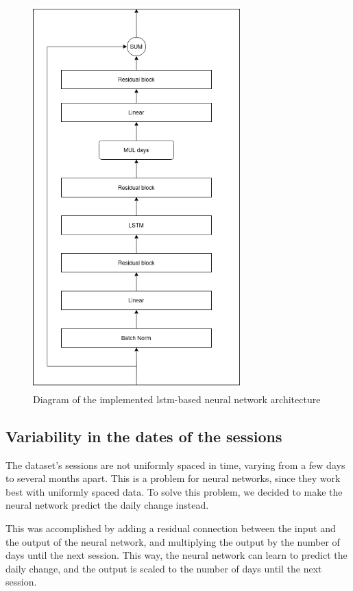 
\begin{figure}
    \centering
    \includegraphics[width=8cm]{files/nn_diagram}
    \caption{Diagram of the implemented \gls{lstm}-based neural network architecture}
\end{figure}

\subsection{Variability in the dates of the sessions}

The dataset's sessions are not uniformly spaced in time, varying from a few
days to several months apart. This is a problem for neural networks, since they
work best with uniformly spaced data. To solve this problem, we decided to make
the neural network predict the daily change instead.

This was accomplished by adding a residual connection between the input and the
output of the neural network, and multiplying the output by the number of days
until the next session. This way, the neural network can learn to predict the
daily change, and the output is scaled to the number of days until the next
session.
